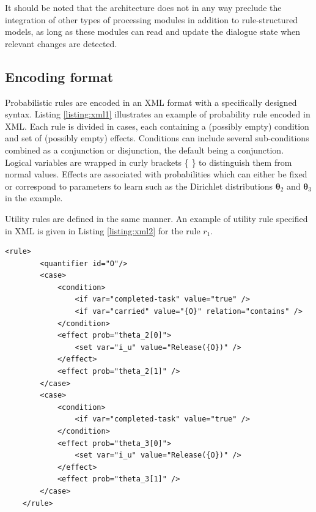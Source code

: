 It should be noted that the architecture does not in any way preclude the integration of other types of processing modules in addition to rule-structured models, as long as these modules can read and update the dialogue state when relevant changes are detected. 

\subsection{Encoding format}

Probabilistic rules are encoded in an XML format with a specifically designed syntax. Listing \ref{listing:xml1} illustrates an example of probability rule encoded in XML. Each rule is divided in cases, each containing a (possibly empty) condition and set of (possibly empty) effects.  Conditions can include several sub-conditions combined as a conjunction or disjunction, the default being a conjunction. Logical variables are wrapped in curly brackets \{ \} to distinguish them from normal values. Effects are associated with probabilities which can either be fixed or correspond to parameters to learn such as the Dirichlet distributions $\boldsymbol\theta_2$ and $\boldsymbol\theta_3$ in the example.  

Utility rules are defined in the same manner.  An example of utility rule specified in XML is given in Listing \ref{listing:xml2} for the rule $r_1$.

\lstset{language=XML}
\begin{lstlisting}[label=listing:xml1,caption=Example of probability rule in XML format, float=p,captionpos=b]
    <rule>
        <quantifier id="O"/>
        <case>
            <condition>
                <if var="completed-task" value="true" />
                <if var="carried" value="{O}" relation="contains" />
            </condition>
            <effect prob="theta_2[0]">
                <set var="i_u" value="Release({O})" />
            </effect>
            <effect prob="theta_2[1]" />
        </case>
        <case>
            <condition>
                <if var="completed-task" value="true" />
            </condition>
            <effect prob="theta_3[0]">
                <set var="i_u" value="Release({O})" />
            </effect>
            <effect prob="theta_3[1]" />
        </case>
    </rule>
\end{lstlisting}


